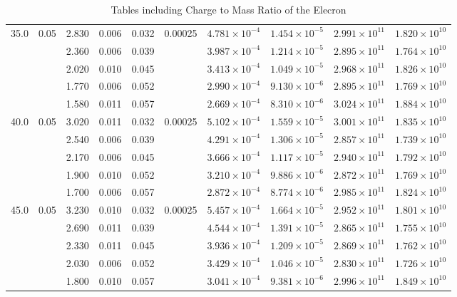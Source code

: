 \documentclass{article}
\begin{document}
\begin{table}[ht]
\begin{tabular}{c|c||c|c||c|c||c|c||c|c}
\midrule
35.0 & 0.05 & 2.830 & 0.006 & 0.032 & 0.00025 & $4.781\times10^{-4}$ & $1.454\times10^{-5}$ & $2.991\times10^{11}$ & $1.820\times10^{10}$ \\
     &      & 2.360 & 0.006 & 0.039 &          & $3.987\times10^{-4}$ & $1.214\times10^{-5}$ & $2.895\times10^{11}$ & $1.764\times10^{10}$ \\
     &      & 2.020 & 0.010 & 0.045 &          & $3.413\times10^{-4}$ & $1.049\times10^{-5}$ & $2.968\times10^{11}$ & $1.826\times10^{10}$ \\
     &      & 1.770 & 0.006 & 0.052 &          & $2.990\times10^{-4}$ & $9.130\times10^{-6}$ & $2.895\times10^{11}$ & $1.769\times10^{10}$ \\
     &      & 1.580 & 0.011 & 0.057 &          & $2.669\times10^{-4}$ & $8.310\times10^{-6}$ & $3.024\times10^{11}$ & $1.884\times10^{10}$ \\
\midrule
40.0 & 0.05 & 3.020 & 0.011 & 0.032 & 0.00025 & $5.102\times10^{-4}$ & $1.559\times10^{-5}$ & $3.001\times10^{11}$ & $1.835\times10^{10}$ \\
     &      & 2.540 & 0.006 & 0.039 &          & $4.291\times10^{-4}$ & $1.306\times10^{-5}$ & $2.857\times10^{11}$ & $1.739\times10^{10}$ \\
     &      & 2.170 & 0.006 & 0.045 &          & $3.666\times10^{-4}$ & $1.117\times10^{-5}$ & $2.940\times10^{11}$ & $1.792\times10^{10}$ \\
     &      & 1.900 & 0.010 & 0.052 &          & $3.210\times10^{-4}$ & $9.886\times10^{-6}$ & $2.872\times10^{11}$ & $1.769\times10^{10}$ \\
     &      & 1.700 & 0.006 & 0.057 &          & $2.872\times10^{-4}$ & $8.774\times10^{-6}$ & $2.985\times10^{11}$ & $1.824\times10^{10}$ \\
\midrule
45.0 & 0.05 & 3.230 & 0.010 & 0.032 & 0.00025 & $5.457\times10^{-4}$ & $1.664\times10^{-5}$ & $2.952\times10^{11}$ & $1.801\times10^{10}$ \\
     &      & 2.690 & 0.011 & 0.039 &          & $4.544\times10^{-4}$ & $1.391\times10^{-5}$ & $2.865\times10^{11}$ & $1.755\times10^{10}$ \\
     &      & 2.330 & 0.011 & 0.045 &          & $3.936\times10^{-4}$ & $1.209\times10^{-5}$ & $2.869\times10^{11}$ & $1.762\times10^{10}$ \\
     &      & 2.030 & 0.006 & 0.052 &          & $3.429\times10^{-4}$ & $1.046\times10^{-5}$ & $2.830\times10^{11}$ & $1.726\times10^{10}$ \\
     &      & 1.800 & 0.010 & 0.057 &          & $3.041\times10^{-4}$ & $9.381\times10^{-6}$ & $2.996\times10^{11}$ & $1.849\times10^{10}$ \\
\bottomrule
\end{tabular}
\caption{Tables including Charge to Mass Ratio of the Elecron}
\end{table}
\end{document}
